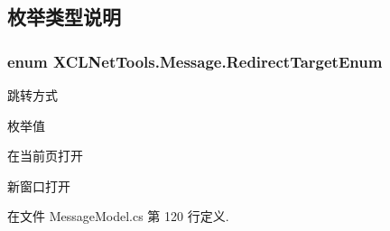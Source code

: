 \subsection{枚举类型说明}
\hypertarget{namespace_x_c_l_net_tools_1_1_message_a7f19b509275317a7b01e7dc5cb615095}{
\subsubsection[{Redirect\-Target\-Enum}]{\setlength{\rightskip}{0pt plus 5cm}enum {\bf X\-C\-L\-Net\-Tools.\-Message.\-Redirect\-Target\-Enum}}}\label{namespace_x_c_l_net_tools_1_1_message_a7f19b509275317a7b01e7dc5cb615095}


跳转方式 

\begin{Desc}
\item[枚举值]\par
\begin{description}
\item[{\em 
\hypertarget{namespace_x_c_l_net_tools_1_1_message_a7f19b509275317a7b01e7dc5cb615095a6adf97f83acf6453d4a6a4b1070f3754}{None}\label{namespace_x_c_l_net_tools_1_1_message_a7f19b509275317a7b01e7dc5cb615095a6adf97f83acf6453d4a6a4b1070f3754}
}]在当前页打开 \item[{\em 
\hypertarget{namespace_x_c_l_net_tools_1_1_message_a7f19b509275317a7b01e7dc5cb615095aa9453646c9602d8a4f00d42b7c9844ab}{New\-Blank}\label{namespace_x_c_l_net_tools_1_1_message_a7f19b509275317a7b01e7dc5cb615095aa9453646c9602d8a4f00d42b7c9844ab}
}]新窗口打开 \end{description}
\end{Desc}


在文件 Message\-Model.\-cs 第 120 行定义.


